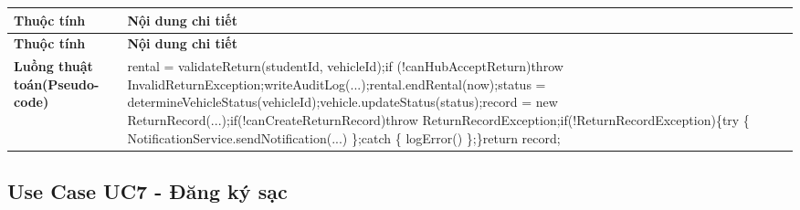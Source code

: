 \vspace{-0.5\baselineskip}
\begin{longtable}{|L{0.24\textwidth}|L{0.70\textwidth}|}
\hline
\textbf{Thuộc tính} & \textbf{Nội dung chi tiết} \\
\hline
\endfirsthead
\hline
\textbf{Thuộc tính} & \textbf{Nội dung chi tiết} \\
\hline
\endhead
\textbf{Luồng thuật toán}\newline \textbf{(Pseudo-code)} & rental = validateReturn(studentId, vehicleId);\newline if (!canHubAcceptReturn)\newline throw InvalidReturnException;\newline writeAuditLog(...);\newline rental.endRental(now);\newline status = determineVehicleStatus(vehicleId);\newline vehicle.updateStatus(status);\newline record = new ReturnRecord(...);\newline if(!canCreateReturnRecord)\newline throw ReturnRecordException;\newline if(!ReturnRecordException)\{\newline try \{ NotificationService.sendNotification(...) \};\newline catch \{ logError() \};\newline \}\newline return record; \\
\hline
\end{longtable}
\vspace{-0.5\baselineskip}
\subsection{Use Case UC7 - Đăng ký sạc}
